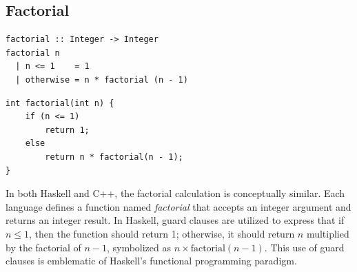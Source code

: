 \documentclass[a4paper, 10pt]{article}
\begin{document}
    \newpage
    \subsection{Factorial}

    \begin{minipage}[t]{0.45\textwidth}
        \lstset{language=Haskell}
        \begin{lstlisting}
factorial :: Integer -> Integer
factorial n
  | n <= 1    = 1
  | otherwise = n * factorial (n - 1)
        \end{lstlisting}
    \end{minipage}
    \hfill
    \begin{minipage}[t]{0.45\textwidth}
        \centering
        \vspace*{3mm}
        \lstset{language=C++}
        \begin{lstlisting}
int factorial(int n) {
    if (n <= 1)
        return 1;
    else
        return n * factorial(n - 1);
}
        \end{lstlisting}
    \end{minipage}

    \vspace*{3mm}
    \noindent In both Haskell and C++, the factorial calculation is conceptually similar. Each language defines a function named \textit{factorial} that accepts an integer argument and returns an integer result. In Haskell, guard clauses are utilized to express that if \( n \leq 1 \), then the function should return 1; otherwise, it should return \( n \) multiplied by the factorial of \( n - 1 \), symbolized as \( n \times \text{factorial}(n - 1) \). This use of guard clauses is emblematic of Haskell's functional programming paradigm.
\end{document}
